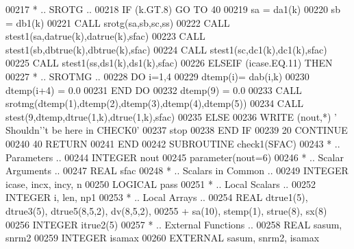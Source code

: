 \begin{DoxyCode}
00217 \textcolor{comment}{*           .. SROTG ..}
00218             \textcolor{keywordflow}{IF} (k.GT.8) \textcolor{keywordflow}{GO TO} 40
00219             sa = da1(k)
00220             sb = db1(k)
00221             \textcolor{keyword}{CALL }srotg(sa,sb,sc,ss)
00222             \textcolor{keyword}{CALL }stest1(sa,datrue(k),datrue(k),sfac)
00223             \textcolor{keyword}{CALL }stest1(sb,dbtrue(k),dbtrue(k),sfac)
00224             \textcolor{keyword}{CALL }stest1(sc,dc1(k),dc1(k),sfac)
00225             \textcolor{keyword}{CALL }stest1(ss,ds1(k),ds1(k),sfac)
00226          \textcolor{keywordflow}{ELSEIF} (icase.EQ.11) \textcolor{keywordflow}{THEN}
00227 \textcolor{comment}{*           .. SROTMG ..}
00228             \textcolor{keywordflow}{DO} i=1,4
00229                dtemp(i)= dab(i,k)
00230                dtemp(i+4) = 0.0
00231 \textcolor{keywordflow}{            END DO}
00232             dtemp(9) = 0.0
00233             \textcolor{keyword}{CALL }srotmg(dtemp(1),dtemp(2),dtemp(3),dtemp(4),dtemp(5))
00234             \textcolor{keyword}{CALL }stest(9,dtemp,dtrue(1,k),dtrue(1,k),sfac)
00235          \textcolor{keywordflow}{ELSE}
00236             \textcolor{keyword}{WRITE} (nout,*) \textcolor{stringliteral}{' Shouldn'}\textcolor{stringliteral}{'t be here in CHECK0'}
00237             stop
00238 \textcolor{keywordflow}{         END IF}
00239    20 \textcolor{keywordflow}{CONTINUE}
00240    40 \textcolor{keywordflow}{RETURN}
00241 \textcolor{keyword}{      END}
00242 \textcolor{keyword}{      SUBROUTINE }check1(SFAC)
00243 \textcolor{comment}{*     .. Parameters ..}
00244       \textcolor{keywordtype}{INTEGER}           nout
00245       parameter(nout=6)
00246 \textcolor{comment}{*     .. Scalar Arguments ..}
00247       \textcolor{keywordtype}{REAL}              sfac
00248 \textcolor{comment}{*     .. Scalars in Common ..}
00249       \textcolor{keywordtype}{INTEGER}           icase, incx, incy, n
00250       \textcolor{keywordtype}{LOGICAL}           pass
00251 \textcolor{comment}{*     .. Local Scalars ..}
00252       \textcolor{keywordtype}{INTEGER}           i, len, np1
00253 \textcolor{comment}{*     .. Local Arrays ..}
00254       \textcolor{keywordtype}{REAL}              dtrue1(5), dtrue3(5), dtrue5(8,5,2), dv(8,5,2),
00255      +                  sa(10), stemp(1), strue(8), sx(8)
00256       \textcolor{keywordtype}{INTEGER}           itrue2(5)
00257 \textcolor{comment}{*     .. External Functions ..}
00258       \textcolor{keywordtype}{REAL}              sasum, snrm2
00259       \textcolor{keywordtype}{INTEGER}           isamax
00260       \textcolor{keywordtype}{EXTERNAL}          sasum, snrm2, isamax

\end{DoxyCode}
